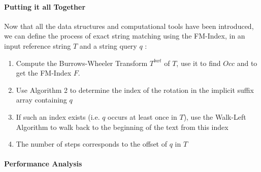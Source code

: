 \paragraph{Putting it all Together}

Now that all the data structures and computational tools have been introduced, we can define the process of exact string matching using the FM-Index, in an input reference string $T$ and a string query $q$ :
\begin{enumerate}
\item Compute the Burrows-Wheeler Transform $T^{bwt}$ of $T$, use it to find $Occ$ and to get the FM-Index $F$.
\item Use Algorithm 2 to determine the index of the rotation in the implicit suffix array containing $q$
\item If such an index exists (i.e. $q$ occurs at least once in $T$), use the Walk-Left Algorithm to walk back to the beginning of the text from this index
\item The number of steps corresponds to the offset of $q$ in $T$
\end{enumerate}

\paragraph{Performance Analysis}

